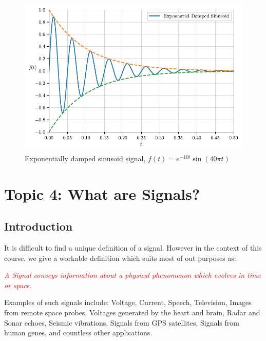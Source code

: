 \documentclass[
  12pt,
  a4paper,
]{report}
\begin{document}
\begin{figure}

{\centering \includegraphics{index_files/figure-pdf/exp-damped-sinusoid-output-1.pdf}

}

\caption{Exponentially damped sinusoid signal,
\(f(t) =  e^{-10t} \sin(40\pi t)\)}

\end{figure}%

\newpage{}

\section{Topic 4: What are Signals?}\label{topic-4-what-are-signals}

\subsection{Introduction}\label{introduction}

It is difficult to find a unique definition of a signal. However in the context of this course, we give a workable definition which suits most of out purposes as:\\
\begin{tcolorbox}[colback=boxbodycol,colframe=boxheadcol]
    \begin{center}
        \textcolor{red}{\emph{A Signal conveys information about a physical phenomenon which evolves in time or space.}}
    \end{center}
\end{tcolorbox}

Examples of such signals include: Voltage, Current, Speech, Television,
Images from remote space probes, Voltages generated by the heart and
brain, Radar and Sonar echoes, Seismic vibrations, Signals from GPS
satellites, Signals from human genes, and countless other applications.
\end{document}
